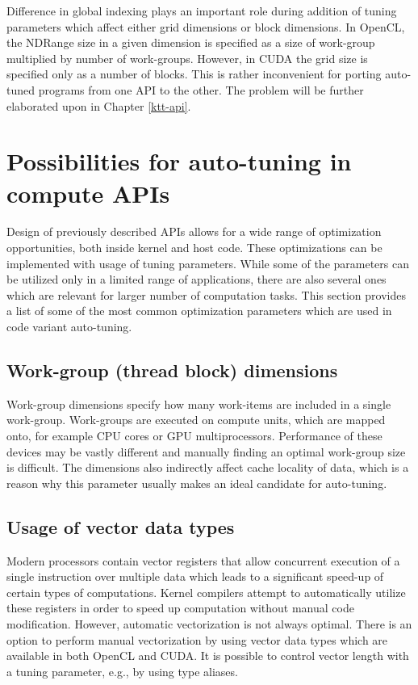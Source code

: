 \documentclass
[
    digital, %
    oneside, %
    table, %
    nolof, %
    nolot, %
    nocover %
]{fithesis3}
\begin{document}
Difference in global indexing plays an important role during addition of tuning parameters which affect either grid dimensions or block dimensions.
In OpenCL, the NDRange size in a given dimension is specified as a size of work-group multiplied by number of work-groups. However, in CUDA the grid
size is specified only as a number of blocks. This is rather inconvenient for porting auto-tuned programs from one API to the other. The problem
will be further elaborated upon in Chapter \ref{ktt-api}.

\section{Possibilities for auto-tuning in compute APIs}
Design of previously described APIs allows for a wide range of optimization opportunities, both inside kernel and host code. These optimizations can
be implemented with usage of tuning parameters. While some of the parameters can be utilized only in a limited range of applications, there are also
several ones which are relevant for larger number of computation tasks. This section provides a list of some of the most common optimization parameters
which are used in code variant auto-tuning.

\subsection{Work-group (thread block) dimensions}
Work-group dimensions specify how many work-items are included in a single work-group. Work-groups are executed on compute units, which are mapped
onto, for example CPU cores or GPU multiprocessors. Performance of these devices may be vastly different and manually finding an optimal work-group
size is difficult. The dimensions also indirectly affect cache locality of data, which is a reason why this parameter usually makes an ideal candidate
for auto-tuning.

\subsection{Usage of vector data types}
Modern processors contain vector registers that allow concurrent execution of a single instruction over multiple data which leads to a significant
speed-up of certain types of computations. Kernel compilers attempt to automatically utilize these registers in order to speed up computation without
manual code modification. However, automatic vectorization is not always optimal. There is an option to perform manual vectorization by using vector
data types which are available in both OpenCL and CUDA. It is possible to control vector length with a tuning parameter, e.g., by using type aliases.
\end{document}
